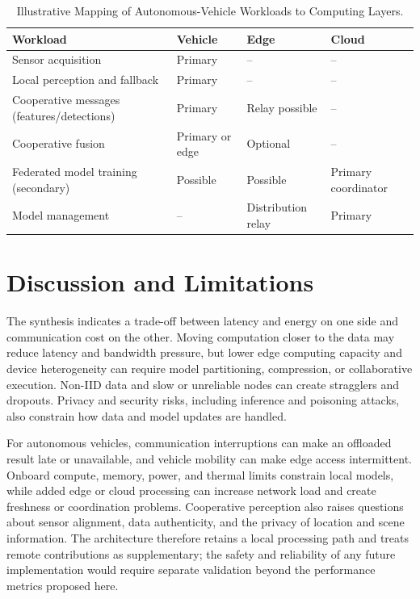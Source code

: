 \documentclass[12pt,a4paper,oneside]{report}
\begin{document}
\begin{table}[H]
  \centering
  \footnotesize
  \renewcommand{\arraystretch}{1.15}
  \caption{Illustrative Mapping of Autonomous-Vehicle Workloads to Computing Layers.}
  \label{tab:av-workload-allocation}
  \begin{tabularx}{\textwidth}{
    >{\raggedright\arraybackslash}p{}
    >{\centering\arraybackslash}p{}
    >{\centering\arraybackslash}p{}
    >{\centering\arraybackslash}X}
    \toprule
    Workload & Vehicle & Edge & Cloud \\
    \midrule
    Sensor acquisition & Primary & -- & -- \\
    Local perception and fallback & Primary & -- & -- \\
    Cooperative messages (features/detections) & Primary & Relay possible & -- \\
    Cooperative fusion & Primary or edge & Optional & -- \\
    Federated model training (secondary) & Possible & Possible & Primary coordinator \\
    Model management & -- & Distribution relay & Primary \\
    \bottomrule
  \end{tabularx}
\end{table}

\section{Discussion and Limitations}

The synthesis indicates a trade-off between latency and energy on one side
and communication cost on the other. Moving computation closer to the data
may reduce latency and bandwidth pressure, but lower edge computing
capacity and device heterogeneity can require model partitioning,
compression, or collaborative execution. Non-IID data and
slow or unreliable nodes can create stragglers and dropouts.
Privacy and security risks, including inference and poisoning attacks, also
constrain how data and model updates are handled.

For autonomous vehicles, communication interruptions can make an offloaded
result late or unavailable, and vehicle mobility can make edge access
intermittent. Onboard compute, memory, power, and thermal limits constrain
local models, while added edge or cloud processing can increase network
load and create freshness or coordination problems. Cooperative perception
also raises questions about sensor alignment, data authenticity, and the
privacy of location and scene information. The architecture therefore
retains a local processing path and treats remote contributions as
supplementary; the safety and reliability of any future implementation
would require separate validation beyond the performance metrics proposed
here.
\end{document}
